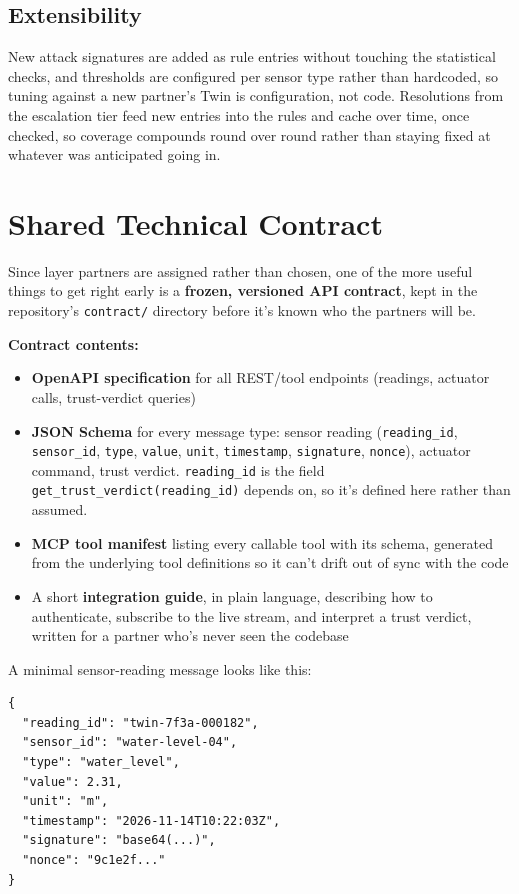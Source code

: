 \documentclass[10pt,letterpaper]{article}
\begin{document}
\subsection{Extensibility}

New attack signatures are added as rule entries without touching the statistical checks, and thresholds are configured per sensor type rather than hardcoded, so tuning against a new partner's Twin is configuration, not code. Resolutions from the escalation tier feed new entries into the rules and cache over time, once checked, so coverage compounds round over round rather than staying fixed at whatever was anticipated going in.

\section{Shared Technical Contract}

Since layer partners are assigned rather than chosen, one of the more useful things to get right early is a \textbf{frozen, versioned API contract}, kept in the repository's \texttt{contract/} directory before it's known who the partners will be.

\textbf{Contract contents:}

\begin{itemize}[leftmargin=*]
\item \textbf{OpenAPI specification} for all REST/tool endpoints (readings, actuator calls, trust-verdict queries)
\item \textbf{JSON Schema} for every message type: sensor reading (\texttt{reading\_id}, \texttt{sensor\_id}, \texttt{type}, \texttt{value}, \texttt{unit}, \texttt{timestamp}, \texttt{signature}, \texttt{nonce}), actuator command, trust verdict. \texttt{reading\_id} is the field \texttt{get\_trust\_verdict(reading\_id)} depends on, so it's defined here rather than assumed.
\item \textbf{MCP tool manifest} listing every callable tool with its schema, generated from the underlying tool definitions so it can't drift out of sync with the code
\item A short \textbf{integration guide}, in plain language, describing how to authenticate, subscribe to the live stream, and interpret a trust verdict, written for a partner who's never seen the codebase
\end{itemize}

A minimal sensor-reading message looks like this:

\begin{verbatim}
{
  "reading_id": "twin-7f3a-000182",
  "sensor_id": "water-level-04",
  "type": "water_level",
  "value": 2.31,
  "unit": "m",
  "timestamp": "2026-11-14T10:22:03Z",
  "signature": "base64(...)",
  "nonce": "9c1e2f..."
}
\end{verbatim}
\end{document}
